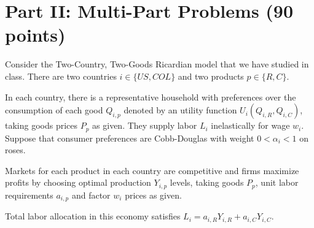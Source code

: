 \documentclass[11pt,letterpaper]{exam}
\newcommand{\red}[1]{\textcolor{red}{#1}}
\begin{document}
\section*{Part II: Multi-Part Problems (90 points)}

\begin{questions}

\question[45]  Consider the Two-Country, Two-Goods Ricardian model that we have studied in class. There are two countries $i \in \{ US,COL \}$ and two products $p \in \{R,C \}$.

In each country, there is a representative household with preferences over the consumption of each good $Q_{i,p}$ denoted by an utility function $U_{i}(Q_{i,R} , Q_{i,C})$, taking goods prices $P_{p}$ as given. They supply labor $L_i$ inelastically for wage $w_i$. Suppose that consumer preferences are Cobb-Douglas with weight $0 < \alpha_i < 1$ on roses. 

Markets for each product in each country are competitive and firms maximize profits by choosing optimal production $Y_{i,p}$ levels, taking goods $P_{p}$, unit labor requirements $a_{i,p}$ and factor $w_i$ prices as given.  

Total labor allocation in this economy satisfies $L_i = a_{i,R} Y_{i,R} + a_{i,C} Y_{i,C}$.

\end{questions}
\end{document}
